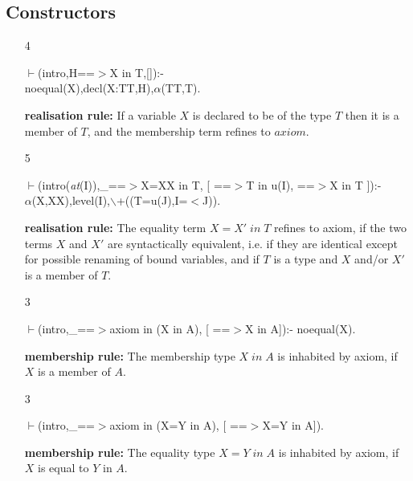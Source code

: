 \documentclass[11pt]{report}
\begin{document}
 \subsection{Constructors}
  
 \begin{enumerate}
 \item[4]
\begin{sf}\begin{tabbing}
$\vdash$(intro,H==$>$X in T,[]):-\\[-0.15ex]
\hspace{2em}noequal(X),decl(X:TT,H),$\alpha$(TT,T).
\end{tabbing}\end{sf}

 {\bf realisation rule:}
 If a variable $X$ is declared to be of the type $T$ then it
 is a member of $T$, and the membership term refines to $axiom$.
  
 \item[5]
\begin{sf}\begin{tabbing}
$\vdash$(intro(\mbox{\it at}(I)),\_\hspace{0.1em}==$>$X=XX in T, [ ==$>$T in u(I), ==$>$X in T ]):-\\[-0.15ex]
\hspace{2em}$\alpha$(X,XX),level(I),$\backslash$+((T=u(J),I=$<$J)).
\end{tabbing}\end{sf}

 {\bf realisation rule:}
 The equality term $X=X'\;in\;T$ refines to axiom, if the two 
 terms $X$ and $X'$ are syntactically equivalent, i.e. if they are 
 identical except for possible renaming of bound variables,
 and if $T$ is a type and $X$ and/or $X'$ is a member of $T$. 
  
 \item[3]
\begin{sf}\begin{tabbing}
$\vdash$(intro,\_\hspace{0.1em}==$>$axiom in (X in A), [ ==$>$X in A]):- noequal(X).
\end{tabbing}\end{sf}

 {\bf membership rule:}
 The membership type $X\;in\;A$ is inhabited by axiom, if $X$ is a
 member of $A$.
  
 \item[3]
\begin{sf}\begin{tabbing}
$\vdash$(intro,\_\hspace{0.1em}==$>$axiom in (X=Y in A), [ ==$>$X=Y in A]).
\end{tabbing}\end{sf}

 {\bf membership rule:}
 The equality type $X=Y\;in\;A$ is inhabited by axiom, if $X$ is
 equal to $Y$ in $A$. 
 \end{enumerate}
  
\end{document}
